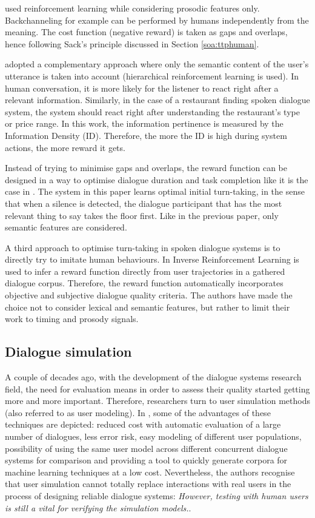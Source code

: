         \cite{Jonsdottir2008} used reinforcement learning while considering prosodic features only. Backchanneling for example can be performed by humans independently from the meaning. The cost function (negative reward) is taken as gaps and overlaps, hence following Sack's principle discussed in Section \ref{soa:ttphuman}.
        
        \cite{Dethlefs2012} adopted a complementary approach where only the semantic content of the user's utterance is taken into account (hierarchical reinforcement learning is used). In human conversation, it is more likely for the listener to react right after a relevant information. Similarly, in the case of a restaurant finding spoken dialogue system, the system should react right after understanding the restaurant's type or price range. In this work, the information pertinence is measured by the Information Density (ID). Therefore, the more the ID is high during system actions, the more reward it gets.
        
        Instead of trying to minimise gaps and overlaps, the reward function can be designed in a way to optimise dialogue duration and task completion like it is the case in \cite{Selfridge2010}. The system in this paper learns optimal initial turn-taking, in the sense that when a silence is detected, the dialogue participant that has the most relevant thing to say takes the floor first. Like in the previous paper, only semantic features are considered.
        
        A third approach to optimise turn-taking in spoken dialogue systems is to directly try to imitate human behaviours. In \cite{Kim2014} Inverse Reinforcement Learning is used to infer a reward function directly from user trajectories in a gathered dialogue corpus. Therefore, the reward function automatically incorporates objective and subjective dialogue quality criteria. The authors have made the choice not to consider lexical and semantic features, but rather to limit their work to timing and prosody signals.
    
    \subsection{Dialogue simulation}
    
    	A couple of decades ago, with the development of the dialogue systems research field, the need for evaluation means in order to assess their quality started getting more and more important. Therefore, researchers turn to user simulation methods (also referred to as user modeling). In \cite{Eckert1997}, some of the advantages of these techniques are depicted: reduced cost with automatic evaluation of a large number of dialogues, less error risk, easy modeling of different user populations, possibility of using the same user model across different concurrent dialogue systems for comparison and providing a tool to quickly generate corpora for machine learning techniques at a low cost. Nevertheless, the authors recognise that user simulation cannot totally replace interactions with real users in the process of designing reliable dialogue systems: \textit{However, testing with human users is still a vital for verifying the simulation models.}.
        
